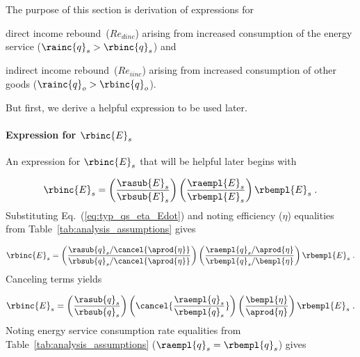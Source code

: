 The purpose of this section is derivation of expressions for 
%
\begin{enumerate*}[label={(\alph*)}]
	
  \item direct income rebound~($Re_{dinc}$) 
        arising from increased consumption of the energy service 
        ($\rainc{q}_s > \rbinc{q}_s$) and
  
  \item indirect income rebound~($Re_{iinc}$) 
        arising from increased consumption of other goods 
        ($\rainc{q}_o > \rbinc{q}_o$).
    
\end{enumerate*}

But first, we derive a helpful expression to be used later.

\paragraph{Expression for $\rbinc{E}_s$}
\label{sec:E_dot_s_hat_expression}

An expression for $\rbinc{E}_s$ that will be helpful later
begins with

\begin{equation}
  \rbinc{E}_s = \left( \frac{\rasub{E}_s}{\rbsub{E}_s} \right)
                \left( \frac{\raempl{E}_s}{\rbempl{E}_s} \right)
                \rbempl{E}_s \; .
\end{equation}
%
Substituting Eq.~(\ref{eq:typ_qs_eta_Edot}) and noting efficiency ($\eta$)
equalities from Table~\ref{tab:analysis_assumptions} gives

\begin{equation}
  \rbinc{E}_s = \left( \frac{\rasub{q}_s / \cancel{\aprod{\eta}}}{\rbsub{q}_s / \cancel{\aprod{\eta}}} \right)
                \left( \frac{\raempl{q}_s / \aprod{\eta}}{\rbempl{q}_s / \bempl{\eta}} \right)
                \rbempl{E}_s \; .
\end{equation}
%
Canceling terms yields

\begin{equation}
  \rbinc{E}_s = \left( \frac{\rasub{q}_s}{\rbsub{q}_s} \right)
                \left( \cancel{\frac{\raempl{q}_s}{\rbempl{q}_s}} \right)
                \left( \frac{\bempl{\eta}}{\aprod{\eta}}  \right)
                \rbempl{E}_s \; .
\end{equation}
%
Noting energy service consumption rate equalities from Table~\ref{tab:analysis_assumptions}
($\raempl{q}_s = \rbempl{q}_s$) gives

